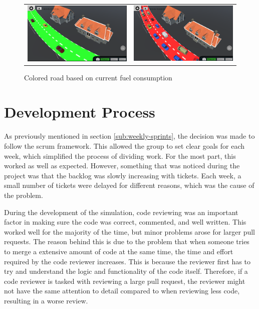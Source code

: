     \begin{figure}[H]
        \begin{tabular}{cc}
            \includegraphics[width=0.48\linewidth]{Project_report/figures/method/green road.png} & 
            \includegraphics[width=0.48\linewidth]{Project_report/figures/method/red road.png} \\
        \end{tabular}
        \caption{Colored road based on current fuel consumption}
        \label{fig:color-roads}
    \end{figure}
    
    
\section{Development Process}
    As previously mentioned in section \ref{sub:weekly-sprints}, the decision was made to follow the scrum framework. This allowed the group to set clear goals for each week, which simplified the process of dividing work. For the most part, this worked as well as expected. However, something that was noticed during the project was that the backlog was slowly increasing with tickets. Each week, a small number of tickets were delayed for different reasons, which was the cause of the problem. 

    During the development of the simulation, code reviewing was an important factor in making sure the code was correct, commented, and well written. This worked well for the majority of the time, but minor problems arose for larger pull requests. The reason behind this is due to the problem that when someone tries to merge a extensive amount of code at the same time, the time and effort required by the code reviewer increases. This is because the reviewer first has to try and understand the logic and functionality of the code itself. Therefore, if a code reviewer is tasked with reviewing a large pull request, the reviewer might not have the same attention to detail compared to when reviewing less code, resulting in a worse review.

